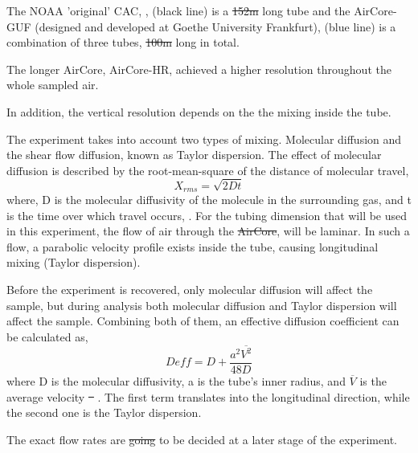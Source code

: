 \documentclass[a4paper,12pt,twoside, final]{article}
\providecommand{\DIFaddtex}[1]{{\protect\color{blue}\uwave{#1}}} %
\providecommand{\DIFdeltex}[1]{{\protect\color{red}\sout{#1}}}                      %
\providecommand{\DIFaddbegin}{} %
\providecommand{\DIFaddend}{} %
\providecommand{\DIFdelbegin}{} %
\providecommand{\DIFdelend}{} %
\providecommand{\DIFadd}[1]{\texorpdfstring{\DIFaddtex{#1}}{#1}} %
\providecommand{\DIFdel}[1]{\texorpdfstring{\DIFdeltex{#1}}{}} %
\newcommand{\DIFscaledelfig}{0.5}
\newlength{\DIFdelgraphicswidth} %
\newlength{\DIFdelgraphicsheight} %
\newcommand{\DIFaddincludegraphics}[2][]{{\color{blue}\fbox{\DIFOincludegraphics[#1]{#2}}}} %
\newcommand{\DIFdelincludegraphics}[2][]{%
\sbox{\DIFdelgraphicsbox}{\DIFOincludegraphics[#1]{#2}}%
\settoboxwidth{\DIFdelgraphicswidth}{\DIFdelgraphicsbox} %
\settoboxtotalheight{\DIFdelgraphicsheight}{\DIFdelgraphicsbox} %
\scalebox{\DIFscaledelfig}{%
\parbox[b]{\DIFdelgraphicswidth}{\usebox{\DIFdelgraphicsbox}\\[-\baselineskip] \rule{\DIFdelgraphicswidth}{0em}}\llap{\resizebox{\DIFdelgraphicswidth}{\DIFdelgraphicsheight}{%
\setlength{\unitlength}{\DIFdelgraphicswidth}%
\begin{picture}(1,1)%
\thicklines\linethickness{2pt} %
{\color[rgb]{1,0,0}\put(0,0){\framebox(1,1){}}}%
{\color[rgb]{1,0,0}\put(0,0){\line( 1,1){1}}}%
{\color[rgb]{1,0,0}\put(0,1){\line(1,-1){1}}}%
\end{picture}%
}\hspace*{3pt}}} %
} %
\DeclareRobustCommand{\DIFaddbegin}{\DIFOaddbegin \let\includegraphics\DIFaddincludegraphics} %
\DeclareRobustCommand{\DIFaddend}{\DIFOaddend \let\includegraphics\DIFOincludegraphics} %
\DeclareRobustCommand{\DIFdelbegin}{\DIFOdelbegin \let\includegraphics\DIFdelincludegraphics} %
\DeclareRobustCommand{\DIFdelend}{\DIFOaddend \let\includegraphics\DIFOincludegraphics} %
\begin{document}
The NOAA 'original' CAC, \cite{Karion}, (black line) is a \DIFdelbegin \DIFdel{152m }\DIFdelend \DIFaddbegin \DIFadd{152 m }\DIFaddend long tube and the AirCore-GUF (designed and developed at Goethe University Frankfurt), (blue line) is a combination of three tubes, \DIFdelbegin \DIFdel{100m }\DIFdelend \DIFaddbegin \DIFadd{100 m }\DIFaddend long in total.

The longer AirCore, AirCore-HR, achieved a higher resolution throughout the whole sampled air. 

In addition, the vertical resolution depends on the the mixing inside the tube. 

The experiment takes into account two types of mixing. Molecular diffusion and the shear flow diffusion, known as Taylor dispersion. The effect of molecular diffusion is described by the root-mean-square of the distance of molecular travel, 
\begin{equation}
    X_{rms} = \sqrt{2Dt}
\end{equation}
where, D is the molecular diffusivity of the molecule in the surrounding gas, and t is the time over which travel occurs, \cite{Karion}.
For the tubing dimension that will be used in this experiment, the flow of air through the \DIFdelbegin \DIFdel{AirCore}\DIFdelend \DIFaddbegin \DIFadd{CAC}\DIFaddend , will be laminar. In such a flow, a parabolic velocity profile exists inside the tube, causing longitudinal mixing (Taylor dispersion). 
\DIFaddbegin 

\DIFaddend Before the experiment is recovered, only molecular diffusion will affect the sample, but during analysis both molecular diffusion and Taylor dispersion will affect the sample. Combining both of them, an effective diffusion coefficient can be calculated as,
 \begin{equation}
     D{eff} = D + \frac{a^2\overline{V^2}}{48D}
 \end{equation}
where D is the molecular diffusivity, a is the tube's inner radius, and $\overline{V}$ is the average velocity \DIFdelbegin \DIFdel{\mbox{%
\cite{Olivier}}\hspace{0pt}%
}\DIFdelend \DIFaddbegin \DIFadd{\mbox{%
\cite{Membrive}}\hspace{0pt}%
}\DIFaddend . The first term translates into the longitudinal direction, while the second one is the Taylor dispersion.

The exact flow rates are \DIFdelbegin \DIFdel{going }\DIFdelend to be decided at a later stage of the experiment.
\end{document}

